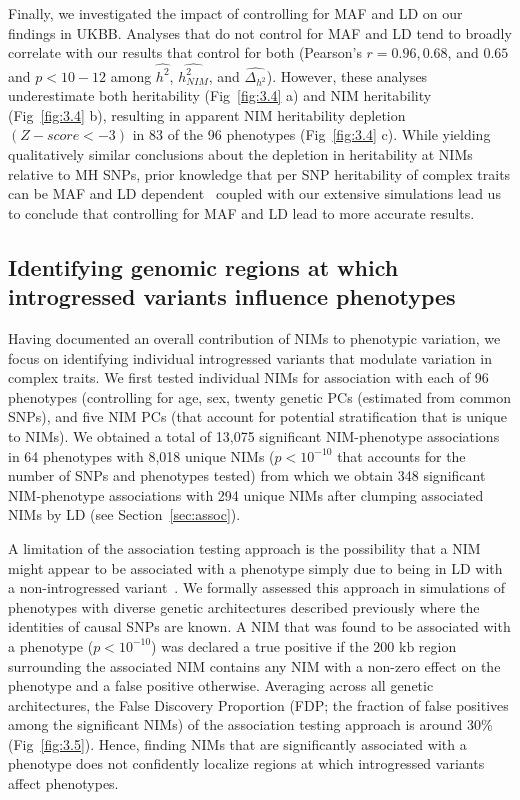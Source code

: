 Finally, we investigated the impact of controlling for MAF and LD on our findings in UKBB. Analyses that do not control for MAF and LD tend to broadly correlate with our results that control for both (Pearson’s $r = 0.96, 0.68$, and $0.65$ and $p < 10-12$ among $\hat{h^2}$, $\hat{h^2_{NIM}}$, and $\hat{\Delta_{h^2}}$). However, these analyses underestimate both heritability (Fig~\ref{fig:3.4} a) and NIM heritability (Fig~\ref{fig:3.4} b), resulting in apparent NIM heritability depletion $(Z-score < -3)$ in 83 of the 96 phenotypes (Fig~\ref{fig:3.4} c). While yielding qualitatively similar conclusions about the depletion in heritability at NIMs relative to MH SNPs, prior knowledge that per SNP heritability of complex traits can be MAF and LD dependent~\cite{evans2018comparison} coupled with our extensive simulations lead us to conclude that controlling for MAF and LD lead to more accurate results. 

\subsection{Identifying genomic regions at which introgressed variants influence phenotypes}
Having documented an overall contribution of NIMs to phenotypic variation, we focus on identifying individual introgressed variants that modulate variation in complex traits. We first tested individual NIMs for association with each of 96 phenotypes (controlling for age, sex, twenty genetic PCs (estimated from common SNPs), and five NIM PCs (that account for potential stratification that is unique to NIMs). We obtained a total of 13,075 significant NIM-phenotype associations in 64 phenotypes with 8,018 unique NIMs ($p < 10^{-10}$ that accounts for the number of SNPs and phenotypes tested)  from which we obtain 348 significant NIM-phenotype associations with 294 unique NIMs after clumping associated NIMs by LD (see Section~\ref{sec:assoc}).
 
A limitation of the association testing approach is the possibility that a NIM might appear to be associated with a phenotype simply due to being in LD with a non-introgressed variant~\cite{skov2020nature}. We formally assessed this approach in simulations of phenotypes with diverse genetic architectures described previously where the identities of causal SNPs are known. A NIM that was found to be associated with a phenotype ($p < 10^{-10}$) was declared a true positive if the 200 kb region surrounding the associated NIM contains any NIM with a non-zero effect on the phenotype and a false positive otherwise. Averaging across all genetic architectures, the False Discovery Proportion (FDP; the fraction of false positives among the significant NIMs) of the association testing approach is around 30\% (Fig~\ref{fig:3.5}). Hence, finding NIMs that are significantly associated with a phenotype does not confidently localize regions at which introgressed variants affect phenotypes.

